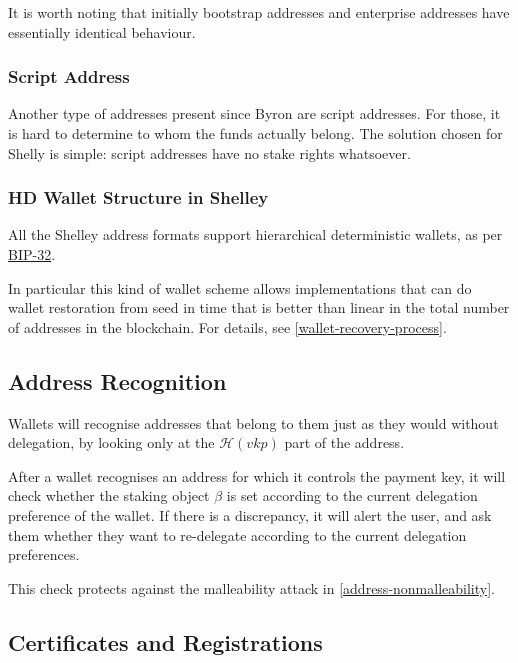 \documentclass[11pt,a4paper]{article}
\begin{document}
It is worth noting that initially bootstrap addresses and enterprise
addresses have essentially identical behaviour.

\subsubsection{Script Address}\label{script-address}

Another type of addresses present since Byron are script addresses. For
those, it is hard to determine to whom the funds actually belong. The
solution chosen for Shelly is simple: script addresses have no stake
rights whatsoever.

\subsubsection{HD Wallet Structure in
Shelley}\label{hd-wallet-structure-in-shelley}

All the Shelley address formats support hierarchical deterministic
wallets, as per
\href{https://github.com/bitcoin/bips/blob/master/bip-0032.mediawiki.}{BIP-32}.

In particular this kind of wallet scheme allows implementations that can
do wallet restoration from seed in time that is better than linear in
the total number of addresses in the blockchain. For details, see
\ref{wallet-recovery-process}.

\subsection{Address Recognition}\label{address-recognition-1}

Wallets will recognise addresses that belong to them just as they would
without delegation, by looking only at the \(\mathcal{H}({vkp})\) part
of the address.

After a wallet recognises an address for which it controls the payment
key, it will check whether the staking object \(\beta\) is set according
to the current delegation preference of the wallet. If there is a
discrepancy, it will alert the user, and ask them whether they want to
re-delegate according to the current delegation preferences.

This check protects against the malleability attack in
\ref{address-nonmalleability}.

\subsection{Certificates and
Registrations}\label{certificates-and-registrations}
\end{document}
